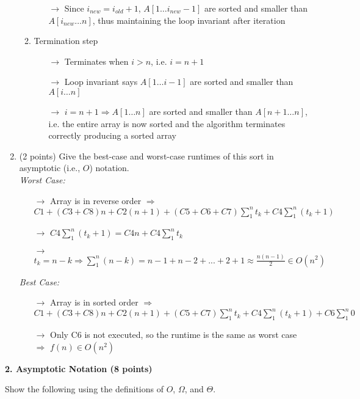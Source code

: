 \documentclass[12pt]{elsart}
\begin{document}
\begin{enumerate}
\begin{enumerate}
\begin{itemize}
		\item[$\rightarrow$] Since $i_{new} = i_{old} + 1$, $A[1 \ldots i_{new} - 1]$ are sorted and smaller than $A[i_{new} \ldots n]$, thus maintaining the loop invariant after iteration
		\end{itemize}
   \item Termination step
		\begin{itemize}
		\item[$\rightarrow$] Terminates when $i > n$, i.e. $i = n + 1$
		\item[$\rightarrow$] Loop invariant says $A[1 \ldots i - 1]$ are sorted and smaller than $A[i \ldots n]$
		\item[$\rightarrow$] $i = n + 1 \Rightarrow A[1 \ldots n]$ are sorted and smaller than $A[n + 1 \ldots n]$, i.e. the entire array is now sorted and the algorithm terminates correctly producing a sorted array
		\end{itemize}
\end{enumerate}
   \item (2 points) Give the best-case and worst-case runtimes of this sort in asymptotic (i.e., $O$) notation.\\
		\textit{Worst Case:}
		\begin{itemize}
		\item[$\rightarrow$] Array is in reverse order $\Rightarrow$ $C1 + (C3 + C8)n + C2(n + 1) + (C5 + C6 + C7)\sum\limits_{1}^{n} t_{k} + C4\sum\limits_{1}^{n} (t_{k} + 1)$
		\item[$\rightarrow$] $C4\sum\limits_{1}^{n} (t_{k} + 1) = C4n + C4\sum\limits_{1}^{n} t_{k}$
		\item[$\rightarrow$] $t_{k} = n - k \Rightarrow \sum\limits_{1}^{n} (n - k) = n - 1 + n - 2 + ... + 2 + 1 \approx \frac{n(n - 1)}{2}\in O(n^2)$
		\end{itemize}
		\textit{Best Case:}
		\begin{itemize}
		\item[$\rightarrow$] Array is in sorted order $\Rightarrow$ $C1 + (C3 + C8)n + C2(n + 1) + (C5 + C7)\sum\limits_{1}^{n} t_{k} + C4\sum\limits_{1}^{n} (t_{k} + 1) + C6\sum\limits_{1}^{n} 0$
		\item[$\rightarrow$] Only C6 is not executed, so the runtime is the same as worst case $\Rightarrow$ $f(n)\in O(n^2)$
		\end{itemize}
\end{enumerate}

{\bf 2. Asymptotic Notation (8 points)}

Show the following using the definitions of $O$, $\Omega$, and $\Theta$.
\end{document}
